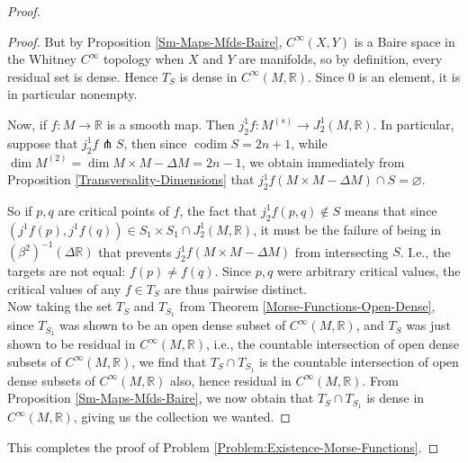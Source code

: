 \documentclass[reqno]{amsart}
\theoremstyle{definition}
\theoremstyle{remark}
\DeclareMathOperator{\codim}{codim}
\begin{document}
\begin{proof}
\begin{proof}
     But by Proposition \ref{Sm-Maps-Mfds-Baire},
     $C^{\infty}(X,Y)$ is a Baire space in the
     Whitney $C^{\infty}$ topology when
     $X$ and $Y$ are manifolds, so by
     definition, every residual set is dense. Hence
     $T_{S}$ is dense in
     $C^{\infty}(M,\mathbb{R})$. Since 
     $0$ is an element, it is in particular nonempty.

  Now, if $f \colon M \to \mathbb{R}$ is a smooth map.
  Then $j_2^{1}f \colon
  M^{(s)} \to J_2^{1}(M, \mathbb{R})$.
  In particular,
  suppose that $j_2^{1}f \pitchfork S$, then since 
  $\codim S = 2n+1$, while
  $\dim M^{(2)} = 
  \dim M \times M - \Delta M= 2n-1 $, we obtain immediately from
  Proposition \ref{Transversality-Dimensions} that
  $j_2^{1}f( M \times M - \Delta M) \cap S = \varnothing$.

  So if $p,q$ are critical points of
  $f$, the fact that
  $j_2^{1}f(p,q) \not\in  S$ means that
  since $\left( j^{1}f(p), j^{1}f(q) \right) 
  \in S_1 \times S_1 \cap J_2^{1}(M, \mathbb{R})$, it
  must be the failure of being in
  $\left( \beta^2 \right)^{-1}\left( \Delta \mathbb{R} \right) $ 
  that prevents $j_2^{1}f
  \left( M \times M- \Delta M \right) $  from intersecting
  $S$. I.e., the targets are not equal:
  $f(p) \neq f(q)$. Since $p,q$ were arbitrary
  critical values,
  the critical values of any
  $f \in T_S$ are thus pairwise distinct.\\

  Now taking the set
  $T_S$ and $T_{S_1}$ from Theorem \ref{Morse-Functions-Open-Dense},
  since $T_{S_1}$ was shown to be an open dense
  subset of $C^{\infty}(M,\mathbb{R})$, and
   $T_S$ was just shown to be
   residual in $C^{\infty}(M,\mathbb{R})$, i.e.,
   the countable intersection of open dense subsets
   of $C^{\infty}(M,\mathbb{R})$, we find that
   $T_S \cap T_{S_1}$ is the countable intersection of
   open dense subsets of $C^{\infty}(M,\mathbb{R})$ also,
   hence residual in $C^{\infty}(M,\mathbb{R})$.
   From Proposition \ref{Sm-Maps-Mfds-Baire}, we now obtain
   that $T_S \cap T_{S_1}$ is dense in
   $C^{\infty}(M,\mathbb{R})$, giving us
   the collection we wanted.






 \end{proof}

 This completes the proof of Problem \ref{Problem:Existence-Morse-Functions}.

 \end{proof}
\end{document}
